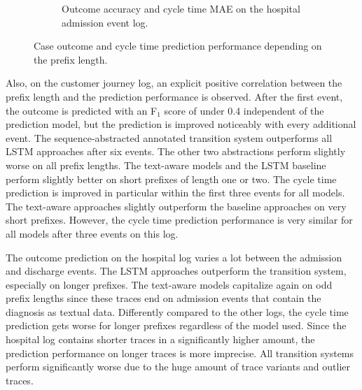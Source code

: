 \begin{figure}[!htbp]
\begin{subfigure}{\textwidth}
		\caption{Outcome accuracy and cycle time MAE on the hospital admission event log.}
	\end{subfigure}
	\caption[Outcome and cycle time prediction performance depending on the prefix length]{Case outcome and cycle time prediction performance depending on the prefix length.}
	\label{fig:outcome-cycle-time-prefix}
\end{figure}

Also, on the customer journey log, an explicit positive correlation between the prefix length and the prediction performance is observed.
After the first event, the outcome is predicted with an F$_1$ score of under 0.4 independent of the prediction model, but the prediction is improved noticeably with every additional event.
The sequence-abstracted annotated transition system outperforms all LSTM approaches after six events.
The other two abstractions perform slightly worse on all prefix lengths.
The text-aware models and the LSTM baseline perform slightly better on short prefixes of length one or two.
The cycle time prediction is improved in particular within the first three events for all models.
The text-aware approaches slightly outperform the baseline approaches on very short prefixes.
However, the cycle time prediction performance is very similar for all models after three events on this log.

The outcome prediction on the hospital log varies a lot between the admission and discharge events.
The LSTM approaches outperform the transition system, especially on longer prefixes.
The text-aware models capitalize again on odd prefix lengths since these traces end on admission events that contain the diagnosis as textual data.
Differently compared to the other logs, the cycle time prediction gets worse for longer prefixes regardless of the model used.
Since the hospital log contains shorter traces in a significantly higher amount, the prediction performance on longer traces is more imprecise.
All transition systems perform significantly worse due to the huge amount of trace variants and outlier traces.

